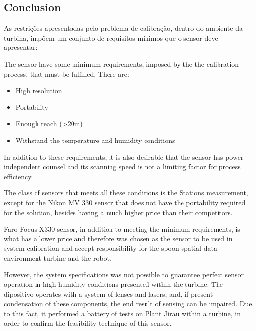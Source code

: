 \subsection{Conclusion}

As restrições apresentadas pelo problema de calibração, dentro do ambiente da
turbina, impõem um conjunto de requisitos mínimos que o sensor deve apresentar:

The sensor have some minimum requirements, imposed by the the calibration
process, that must be fulfilled. There are: 

\begin{itemize}
  \item High resolution
  \item Portability
  \item Enough reach (>20m)
  \item Withstand the temperature and humidity conditions 
\end{itemize}

In addition to these requirements, it is also desirable that the sensor has power
independent counsel and its scanning speed is not a limiting factor
for process efficiency.

The class of sensors that meets all these conditions is the Stations
measurement, except for the Nikon MV 330 sensor that does not have the portability
required for the solution, besides having a much higher price than their
competitors.

Faro Focus X330 sensor, in addition to meeting the minimum requirements, is what
has a lower price and therefore was chosen as the sensor to be used in
system calibration and accept responsibility for the spoon-spatial data environment
turbine and the robot.

However, the system specifications was not possible to guarantee perfect
sensor operation in high humidity conditions presented within the
turbine. The dipositivo operates with a system of lenses and lasers, and, if present
condensation of these components, the end result of sensing can
be impaired. Due to this fact, it performed a battery of tests on
Plant Jirau within a turbine, in order to confirm the feasibility
technique of this sensor.

